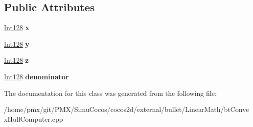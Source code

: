 \subsection*{Public Attributes}
\begin{DoxyCompactItemize}
\item 
\mbox{\label{classbtConvexHullInternal_1_1PointR128_ad38ad0a85f2fb807e1f7058dddc8331c}} 
\hyperlink{classbtConvexHullInternal_1_1Int128}{Int128} {\bfseries x}
\item 
\mbox{\label{classbtConvexHullInternal_1_1PointR128_a4a8fb358cf198c529ec30438d0ec2540}} 
\hyperlink{classbtConvexHullInternal_1_1Int128}{Int128} {\bfseries y}
\item 
\mbox{\label{classbtConvexHullInternal_1_1PointR128_ad49cca5b3aead3090a35fef224894343}} 
\hyperlink{classbtConvexHullInternal_1_1Int128}{Int128} {\bfseries z}
\item 
\mbox{\label{classbtConvexHullInternal_1_1PointR128_a8aa1216b61513babf090b0d6d6fc0f52}} 
\hyperlink{classbtConvexHullInternal_1_1Int128}{Int128} {\bfseries denominator}
\end{DoxyCompactItemize}


The documentation for this class was generated from the following file\+:\begin{DoxyCompactItemize}
\item 
/home/pmx/git/\+P\+M\+X/\+Simu\+Cocos/cocos2d/external/bullet/\+Linear\+Math/bt\+Convex\+Hull\+Computer.\+cpp\end{DoxyCompactItemize}
